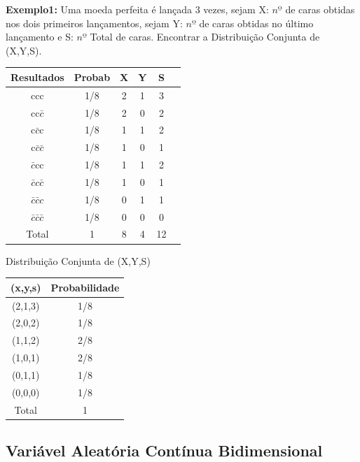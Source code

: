 \documentclass[a4paper,12pt]{report}
\begin{document}
{{\bf Exemplo1:} Uma moeda perfeita é lançada 3 vezes, sejam X:
$nº$ de caras obtidas nos dois primeiros lançamentos, sejam Y:
$nº$ de caras obtidas no último lançamento e S: $nº$ Total de
caras. Encontrar a Distribuição Conjunta de (X,Y,S).\vskip0.3cm


\begin{tabular}{|c|c|c|c|c|c|}
  \hline\hline
  Resultados & Probab & X & Y & S \\
  \hline\hline
  ccc                     & 1/8 & 2 & 1 & 3 \\
  cc$\bar{c}$             & 1/8 & 2 & 0 & 2 \\
  c$\bar{c}$c             & 1/8 & 1 & 1 & 2 \\
  c$\bar{c}\bar{c}$       & 1/8 & 1 & 0 & 1 \\
  $\bar{c}$cc             & 1/8 & 1 & 1 & 2 \\
  $\bar{c}c\bar{c}$       & 1/8 & 1 & 0 & 1 \\
  $\bar{c}\bar{c}c$       & 1/8 & 0 & 1 & 1 \\
  $\bar{c}\bar{c}\bar{c}$ & 1/8 & 0 & 0 & 0 \\
  \hline\hline
  Total                   & 1   & 8 & 4 & 12 \\
  \hline\hline
\end{tabular}


\par Distribuição Conjunta de (X,Y,S)
\begin{tabular}{|c|c|}
  \hline\hline
  (x,y,s) & Probabilidade \\
  \hline\hline
  (2,1,3) & 1/8 \\
  (2,0,2) & 1/8 \\
  (1,1,2) & 2/8 \\
  (1,0,1) & 2/8 \\
  (0,1,1) & 1/8 \\
  (0,0,0) & 1/8 \\
  \hline\hline
  Total & 1 \\
  \hline\hline
\end{tabular}


\subsection{Variável Aleatória Contínua Bidimensional}

}
\end{document}
